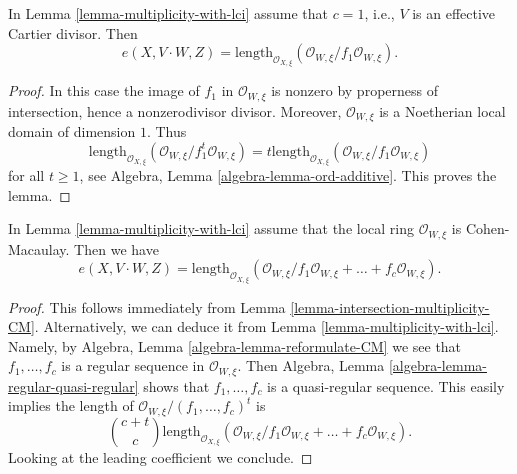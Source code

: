 \begin{lemma}
\label{lemma-multiplicity-with-effective-Cartier-divisor}
In Lemma \ref{lemma-multiplicity-with-lci} assume that  $c = 1$, i.e., $V$
is an effective Cartier divisor. Then
$$
e(X, V \cdot W, Z) =
\text{length}_{\mathcal{O}_{X, \xi}}
(\mathcal{O}_{W, \xi}/f_1\mathcal{O}_{W, \xi}).
$$
\end{lemma}

\begin{proof}
In this case the image of $f_1$ in $\mathcal{O}_{W, \xi}$ is nonzero by
properness of intersection, hence a nonzerodivisor divisor. Moreover,
$\mathcal{O}_{W, \xi}$ is a Noetherian local domain of dimension $1$.
Thus
$$
\text{length}_{\mathcal{O}_{X, \xi}}
(\mathcal{O}_{W, \xi}/f_1^t\mathcal{O}_{W, \xi}) =
t \text{length}_{\mathcal{O}_{X, \xi}}
(\mathcal{O}_{W, \xi}/f_1\mathcal{O}_{W, \xi})
$$
for all $t \geq 1$, see Algebra, Lemma \ref{algebra-lemma-ord-additive}.
This proves the lemma.
\end{proof}

\begin{lemma}
\label{lemma-multiplicity-lci-CM}
In Lemma \ref{lemma-multiplicity-with-lci} assume that
the local ring $\mathcal{O}_{W, \xi}$ is Cohen-Macaulay. Then we
have
$$
e(X, V \cdot W, Z) =
\text{length}_{\mathcal{O}_{X, \xi}} (\mathcal{O}_{W, \xi}/
f_1\mathcal{O}_{W, \xi} + \ldots + f_c\mathcal{O}_{W, \xi}).
$$
\end{lemma}

\begin{proof}
This follows immediately from Lemma \ref{lemma-intersection-multiplicity-CM}.
Alternatively, we can deduce it from Lemma \ref{lemma-multiplicity-with-lci}.
Namely, by Algebra, Lemma \ref{algebra-lemma-reformulate-CM}
we see that $f_1, \ldots, f_c$ is a regular sequence in
$\mathcal{O}_{W, \xi}$. Then
Algebra, Lemma \ref{algebra-lemma-regular-quasi-regular} shows that
$f_1, \ldots, f_c$ is a quasi-regular sequence.
This easily implies the length of
$\mathcal{O}_{W, \xi}/(f_1, \ldots, f_c)^t$ is
$$
{c + t \choose c}
\text{length}_{\mathcal{O}_{X, \xi}} (\mathcal{O}_{W, \xi}/
f_1\mathcal{O}_{W, \xi} + \ldots + f_c\mathcal{O}_{W, \xi}).
$$
Looking at the leading coefficient we conclude.
\end{proof}


